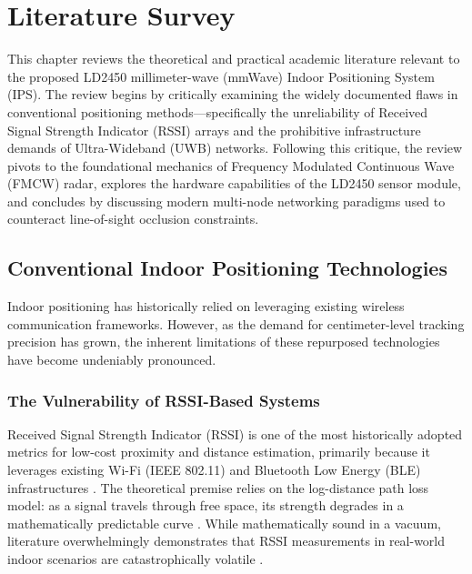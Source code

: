 \chapter{Literature Survey}
\label{Literature_Survey}

This chapter reviews the theoretical and practical academic literature relevant to the proposed LD2450 millimeter-wave (mmWave) Indoor Positioning System (IPS). The review begins by critically examining the widely documented flaws in conventional positioning methods—specifically the unreliability of Received Signal Strength Indicator (RSSI) arrays and the prohibitive infrastructure demands of Ultra-Wideband (UWB) networks. Following this critique, the review pivots to the foundational mechanics of Frequency Modulated Continuous Wave (FMCW) radar, explores the hardware capabilities of the LD2450 sensor module, and concludes by discussing modern multi-node networking paradigms used to counteract line-of-sight occlusion constraints.

\section{Conventional Indoor Positioning Technologies}

Indoor positioning has historically relied on leveraging existing wireless communication frameworks. However, as the demand for centimeter-level tracking precision has grown, the inherent limitations of these repurposed technologies have become undeniably pronounced.

\subsection{The Vulnerability of RSSI-Based Systems}

Received Signal Strength Indicator (RSSI) is one of the most historically adopted metrics for low-cost proximity and distance estimation, primarily because it leverages existing Wi-Fi (IEEE 802.11) and Bluetooth Low Energy (BLE) infrastructures \cite{zafari2019survey}. The theoretical premise relies on the log-distance path loss model: as a signal travels through free space, its strength degrades in a mathematically predictable curve \cite{rappaport1996wireless}. While mathematically sound in a vacuum, literature overwhelmingly demonstrates that RSSI measurements in real-world indoor scenarios are catastrophically volatile \cite{liu2007survey}. 

